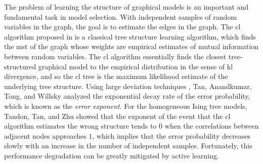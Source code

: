 The problem of learning the structure  of graphical models is an important and fundamental task in model selection. With independent samples of random variables in the graph, the goal is to estimate the edges in the graph. The \ac{cl} algorithm proposed in \cite{chow1968approximating} is a classical tree structure learning algorithm, which finds the \ac{mst} of the graph whose weights are empirical estimates of mutual information between random variables. The \ac{cl} algorithm essentially finds the closest tree-structured graphical model to the empirical distribution in the sense of \ac{kl} divergence, and so the \ac{cl} tree is the maximum likelihood estimate of the underlying tree structure. Using   large deviation techniques \cite{zeitouni1998large}, Tan, Anandkumar, Tong, and Willsky\cite{tan2011large} analyzed the exponential decay rate  of the error probability, which is known as the {\em error exponent}. For the homogeneous Ising tree models, Tandon, Tan, and Zhu\cite{tandon2020exact} showed that the exponent of the event that the \ac{cl} algorithm estimates the wrong structure tends to $0$ when the correlations between adjacent nodes approaches $1$, which implies that the error probability decreases slowly with an increase in the  number of independent samples. Fortunately, this performance degradation can be greatly mitigated by active learning.

